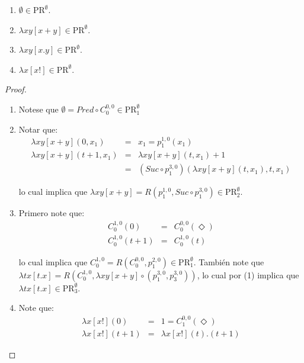   \begin{lemma}
    \begin{enumerate}
      \item $\emptyset \in \mathrm{PR}^{\emptyset}$.
      \item $\lambda xy \left[x+y\right] \in \mathrm{PR}^{\emptyset}$.
      \item $\lambda xy\left[x.y\right] \in \mathrm{PR}^{\emptyset}$.
      \item $\lambda x\left[x!\right] \in \mathrm{PR}^{\emptyset}$.
    \end{enumerate}
  \end{lemma}
  \begin{proof}
    \begin{enumerate}
      \item Notese que $\emptyset = Pred \circ C_{0}^{0,0} \in \mathrm{PR}_{1}^{\emptyset}$
      \item Notar que:
        \begin{eqnarray}
          \nonumber \lambda xy\left[x+y\right](0, x_{1}) &=& x_{1} = p_{1}^{1,0}(x_{1}) \\
          \nonumber \lambda xy\left[x+y\right](t+1, x_{1}) &=& \lambda xy\left[x+y\right](t, x_{1}) + 1 \\
          \nonumber & =& (Suc \circ p_{1}^{3,0}) (\lambda xy\left[x+y\right](t,x_{1}), t, x_{1})
        \end{eqnarray}

        \par lo cual implica que $\lambda xy\left[x+y\right] = R (p_{1}^{1, 0}, Suc \circ p_{1}^{3,0}) \in
        \mathrm{PR}_{2}^{\emptyset}.$
      \item Primero note que:
        \begin{eqnarray}
          \nonumber C_{0}^{1,0}(0) &=& C_{0}^{0,0}(\Diamond) \\
          \nonumber C_{0}^{1,0}(t+1) &=& C_{0}^{1,0}(t)
        \end{eqnarray}

        \par lo cual implica que $C_{0}^{1,0} = R (C_{0}^{0,0}, p_{1}^{2, 0}) \in \mathrm{PR}_{1}^{\emptyset}$.
        También note que $\lambda tx \left[t.x\right] = R (C_{0}^{1,0}, \lambda xy\left[x+y\right] \circ (p_{1}^{3, 0},
        p_{3}^{3,0}))$, lo cual por (1) implica que $\lambda tx\left[t.x\right] \in \mathrm{PR}_{3}^{\emptyset}$.
      \item Note que:
        \begin{eqnarray}
          \nonumber \lambda x\left[x!\right](0) &=& 1 = C_{1}^{0,0}(\Diamond) \\
          \nonumber \lambda x\left[x!\right](t+1) &=& \lambda x\left[x!\right](t).(t+1)
        \end{eqnarray}


\end{enumerate}
\end{proof}
